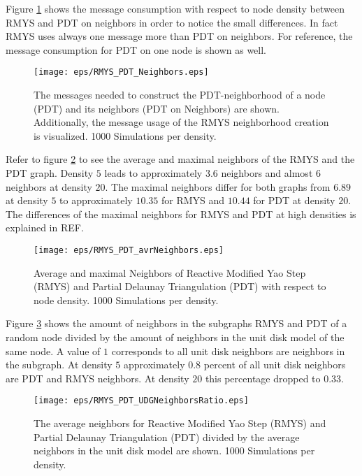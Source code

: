 Figure \ref{fig:RMYS_PDT_Neighbors} shows the message consumption with respect to node density between RMYS and PDT on neighbors in order to notice the small differences.
In fact RMYS uses always one message more than PDT on neighbors.
For reference, the message consumption for PDT on one node is shown as well.

\begin{figure}[h!]
\centering
\texttt{[image: eps/RMYS\_PDT\_Neighbors.eps]}
\caption{The messages needed to construct the PDT-neighborhood of a node (PDT) and its neighbors (PDT on Neighbors) are shown. Additionally, the message usage of the RMYS neighborhood creation is visualized. 1000 Simulations per density.}
\label{fig:RMYS_PDT_Neighbors}
\end{figure}


Refer to figure \ref{fig:RMYS_PDT_avrNeighbors} to see the average and maximal neighbors of the RMYS and the PDT graph.
Density $5 $ leads to approximately $3.6 $ neighbors and almost $6 $ neighbors at density $20 $.
The maximal neighbors differ for both graphs from $6.89 $ at density $5 $ to approximately $10.35 $ for RMYS and $10.44 $ for PDT at density $20 $.
The differences of the maximal neighbors for RMYS and PDT at high densities is explained in REF.

\begin{figure}[h!]
\centering
\texttt{[image: eps/RMYS\_PDT\_avrNeighbors.eps]}
\caption{Average and maximal Neighbors of Reactive Modified Yao Step (RMYS) and Partial Delaunay Triangulation (PDT) with respect to node density. 1000 Simulations per density.}
\label{fig:RMYS_PDT_avrNeighbors}
\end{figure}


Figure \ref{fig:RMYS_PDT_UDGNeighborsRatio} shows the amount of neighbors in the subgraphs RMYS and PDT of a random node divided by the amount of neighbors in the unit disk model of the same node.
A value of $1 $ corresponds to all unit disk neighbors are neighbors in the subgraph.
At density $5 $ approximately $0.8 $ percent of all unit disk neighbors are PDT and RMYS neighbors.
At density $20 $ this percentage dropped to $0.33 $.

\begin{figure}[h!]
\centering
\texttt{[image: eps/RMYS\_PDT\_UDGNeighborsRatio.eps]}
\caption{The average neighbors for Reactive Modified Yao Step (RMYS) and Partial Delaunay Triangulation (PDT) divided by the average neighbors in the unit disk model are shown. 1000 Simulations per density.}
\label{fig:RMYS_PDT_UDGNeighborsRatio}
\end{figure}

